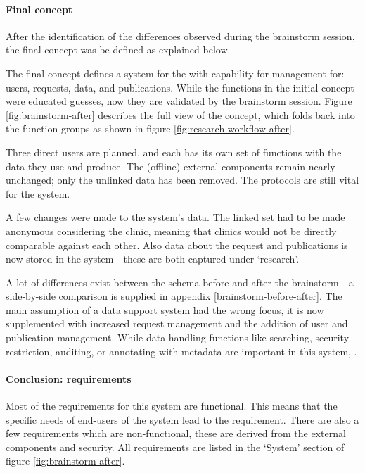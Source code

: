 \paragraph{Final concept}

After the identification of the differences observed during the brainstorm session, the final concept was be defined as explained below.

The final concept defines a system for the \projectdata{} with capability for management for: users, requests, data, and publications.
While the functions in the initial concept were educated guesses, now they are validated by the brainstorm session.
Figure \ref{fig:brainstorm-after} describes the full view of the concept, which folds back into the function groups as shown in figure \ref{fig:research-workflow-after}.

Three direct users are planned, and each has its own set of functions with the data they use and produce.
The (offline) external components remain nearly unchanged; only the unlinked data has been removed. The protocols are still vital for the system.

A few changes were made to the system's data.
The linked set had to be made anonymous considering the clinic, meaning that clinics would not be directly comparable against each other.
Also data about the request and publications is now stored in the system - these are both captured under `research'.

A lot of differences exist between the schema before and after the brainstorm - a side-by-side comparison is supplied in appendix \ref{brainstorm-before-after}.
The main assumption of a data support system had the wrong focus, it is now supplemented with increased request management and the addition of user and publication management.
While data handling functions like searching, security restriction, auditing, or annotating with metadata are important in this system, .


\paragraph{Conclusion: requirements}
Most of the requirements for this system are functional.
This means that the specific needs of end-users of the system lead to the requirement.
There are also a few requirements which are non-functional, these are derived from the external components and security.
All requirements are listed in the `System' section of figure \ref{fig:brainstorm-after}.

